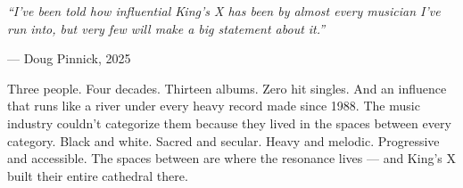 \documentclass[11pt,letterpaper]{article}
\begin{document}
\vspace{1em}

\begin{quotebox}
\textit{``I've been told how influential King's X has been by almost every musician I've run into, but very few will make a big statement about it.''}

\vspace{0.5em}
\hfill--- Doug Pinnick, 2025

\vspace{1em}

Three people. Four decades. Thirteen albums. Zero hit singles. And an influence that runs like a river under every heavy record made since 1988. The music industry couldn't categorize them because they lived in the spaces between every category. Black and white. Sacred and secular. Heavy and melodic. Progressive and accessible. The spaces between are where the resonance lives --- and King's X built their entire cathedral there.
\end{quotebox}
\end{document}
